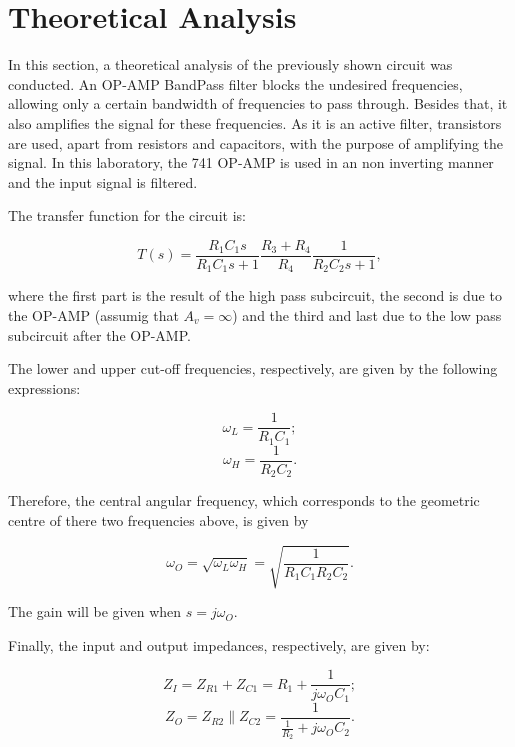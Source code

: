 \section{Theoretical Analysis}
\label{sec:analysis}

In this section, a theoretical analysis of the previously shown circuit was conducted. 
An OP-AMP BandPass filter blocks the undesired frequencies, allowing only a certain bandwidth of frequencies to pass through. Besides that, it also amplifies the signal for these frequencies. As it is an active filter, transistors are used, apart from resistors and capacitors, with the purpose of amplifying the signal. In this laboratory, the 741 OP-AMP is used in an non inverting manner and the input signal is filtered.
\par
The transfer function for the circuit is:

\begin{equation}
	T(s) = \frac{R_1C_1s}{R_1C_1s + 1} \frac{R_3+R_4}{R_4} \frac{1}{R_2C_2s + 1},
	\label{eq:T}
\end{equation}

where the first part is the result of the high pass subcircuit, the second is due to the OP-AMP (assumig that $A_v = \infty$) and the third and last due to the low pass subcircuit after the OP-AMP.

The lower and upper cut-off frequencies, respectively, are given by the following expressions:

\begin{equation}
	\omega_L = \frac{1}{R_1C_1};
	\label{eq:WL}
\end{equation}
\begin{equation}
	\omega_H = \frac{1}{R_2C_2}.
	\label{eq:WH}
\end{equation}

Therefore, the central angular frequency, which corresponds to the geometric centre of there two frequencies above, is given by

\begin{equation}
	\omega_O = \sqrt{\omega_L \omega_H} = \sqrt{ \frac{1}{R_1C_1R_2C_2} }.
	\label{eq:WO}
\end{equation}

The gain will be given when $s = j\omega_O$.

Finally, the input and output impedances, respectively, are given by:

\begin{equation}
	Z_I = Z_{R1} + Z_{C1} = R_1 + \frac{1}{j \omega_O C_1};
	\label{eq:ZI}
\end{equation}
\begin{equation}
	Z_O = Z_{R2} \parallel Z_{C2} = \frac{1}{\frac{1}{R_2} + j \omega_O C_2}.
	\label{eq:ZO}
\end{equation}

